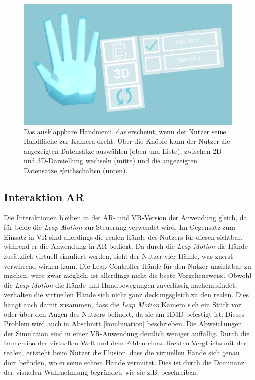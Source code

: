 \begin{figure}[!htb]
	\centering
	\includegraphics[width=0.7\linewidth]{images/handUI_2.png}
	\caption{Das ausklappbare Handmenü, das erscheint, wenn der Nutzer seine Handfläche zur Kamera dreht. Über die Knöpfe kann der Nutzer die angezeigten Datensätze auswählen (oben und Liste), zwischen 2D- und 3D-Darstellung wechseln (mitte) und die angezeigten Datensätze gleichschalten (unten). }
	\label{img:handUI}
\end{figure}
\FloatBarrier

\subsection{Interaktion AR}

Die Interaktionen bleiben in der AR- und VR-Version der Anwendung gleich, da für beide die \textit{Leap Motion} zur Steuerung verwendet wird.
Im Gegensatz zum Einsatz in VR sind allerdings die realen Hände des Nutzers für diesen sichtbar, während er die Anwendung in AR bedient. Da durch die \textit{Leap Motion} die Hände zusätzlich virtuell simuliert werden, sieht der Nutzer vier Hände, was zuerst verwirrend wirken kann. 
Die Leap-Controller-Hände für den Nutzer unsichtbar zu machen, wäre zwar möglich, ist allerdings nicht die beste Vorgehensweise. Obwohl die \textit{Leap Motion} die Hände und Handbewegungen zuverlässig nachempfindet, verhalten die virtuellen Hände sich nicht ganz deckungsgleich zu den realen. Dies hängt auch damit zusammen, dass die \textit{Leap Motion} Kamera sich ein Stück vor oder über den Augen des Nutzers befindet, da sie am HMD befestigt ist. Dieses Problem wird auch in Abschnitt \ref{kombination} beschrieben.
Die Abweichungen der Simulation sind in einer VR-Anwendung deutlich weniger auffällig. Durch die Immersion der virtuellen Welt und dem Fehlen eines direkten Vergleichs mit der realen, entsteht beim Nutzer die Illusion, dass die virtuellen Hände sich genau dort befinden, wo er seine echten Hände vermutet. Dies ist durch die Dominanz der visuellen Wahrnehmung begründet, wie sie z.B. \cite{Azmandian16} beschreiben.

